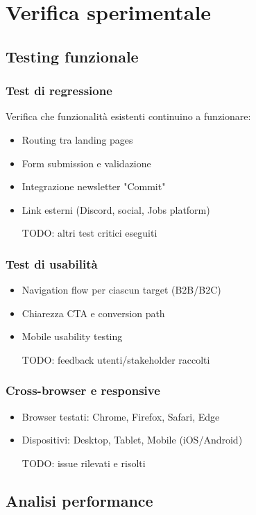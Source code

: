 \chapter{Verifica sperimentale}

\section{Testing funzionale}
\subsection{Test di regressione}
Verifica che funzionalità esistenti continuino a funzionare:
\begin{itemize}
  \item Routing tra landing pages
  \item Form submission e validazione
  \item Integrazione newsletter "Commit"
  \item Link esterni (Discord, social, Jobs platform)
  \item [TODO: altri test critici eseguiti]
\end{itemize}

\subsection{Test di usabilità}
\begin{itemize}
  \item Navigation flow per ciascun target (B2B/B2C)
  \item Chiarezza CTA e conversion path
  \item Mobile usability testing
  \item [TODO: feedback utenti/stakeholder raccolti]
\end{itemize}

\subsection{Cross-browser e responsive}
\begin{itemize}
  \item Browser testati: Chrome, Firefox, Safari, Edge
  \item Dispositivi: Desktop, Tablet, Mobile (iOS/Android)
  \item [TODO: issue rilevati e risolti]
\end{itemize}

\section{Analisi performance}
